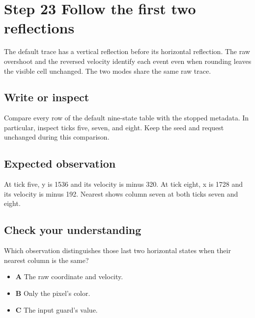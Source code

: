 \section{Step 23 Follow the first two reflections}\label{ball-s23}

The default trace has a vertical reflection before its horizontal reflection. The raw overshoot and the reversed velocity identify each event even when rounding leaves the visible cell unchanged. The two modes share the same raw trace.

\subsection{Write or inspect}
Compare every row of the default nine-state table with the stopped metadata. In particular, inspect ticks five, seven, and eight. Keep the seed and request unchanged during this comparison.

\subsection{Expected observation}
At tick five, y is 1536 and its velocity is minus 320. At tick eight, x is 1728 and its velocity is minus 192. Nearest shows column seven at both ticks seven and eight.

\subsection{Check your understanding}
Which observation distinguishes those last two horizontal states when their nearest column is the same?

\begin{itemize}
  \item \textbf{A} The raw coordinate and velocity.
  \item \textbf{B} Only the pixel’s color.
  \item \textbf{C} The input guard’s value.
\end{itemize}

